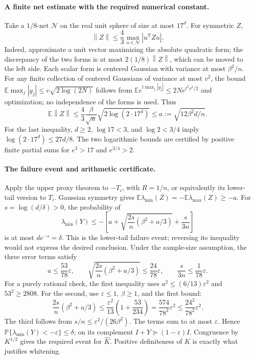 \documentclass[11pt,a4paper]{article}
\newcommand{\norm}[1]{\left\lVert#1\right\rVert}
\begin{document}
\paragraph{A finite net estimate with the required numerical constant.}
Take a $1/8$-net $\mathcal N$ on the real unit sphere of size at most
$17^d$.  For symmetric $Z$,
\[
 \norm{Z}\le\frac43\max_{u\in\mathcal N}|u^{\mathsf T}Zu|.
\]
Indeed, approximate a unit vector maximizing the absolute quadratic
form; the discrepancy of the two forms is at most
$2(1/8)\norm{Z}$, which can be moved to the left side.
Each scalar form is centered Gaussian with variance at most $\beta^2/n$.
For any finite collection of centered Gaussians of variance at most
$v^2$, the bound
$\mathbb E\max_j|g_j|\le v\sqrt{2\log(2N)}$ follows from
$\mathbb Ee^{t\max_j|g_j|}\le2N e^{t^2v^2/2}$ and optimization;
no independence of the forms is used.  Thus
\[
 \mathbb E\norm Z\le\frac43\frac\beta{\sqrt n}
       \sqrt{2\log(2\cdot17^d)}
       \le a:=\sqrt{12\beta^2d/n}.
\]
For the last inequality, $d\ge2$, $\log17<3$, and $\log2<3/4$ imply
$\log(2\cdot17^d)\le27d/8$.  The two logarithmic bounds are certified
by positive finite partial sums for $e^3>17$ and $e^{3/4}>2$.

\paragraph{The failure event and arithmetic certificate.}
Apply the upper proxy theorem to $-T_i$, with $R=1/n$, or equivalently
its lower-tail version to $T_i$.  Gaussian symmetry gives
$\mathbb E\lambda_{\min}(Z)=-\mathbb E\lambda_{\max}(Z)\ge-a$.
For $s=\log(d/\delta)>0$, the probability of
\[
 \lambda_{\min}(Y)
 \le-\left[a+\sqrt{\frac{2s}{n}(\beta^2+a/3)}+\frac{s}{3n}\right]
\]
is at most $de^{-s}=\delta$.  This is the lower-tail failure event;
reversing its inequality would not express the desired conclusion.
Under the sample-size assumption, the three error terms satisfy
\[
 a\le\frac{53}{78}\varepsilon,\qquad
 \sqrt{\frac{2s}{n}(\beta^2+a/3)}\le\frac{24}{78}\varepsilon,
 \qquad \frac{s}{3n}\le\frac1{78}\varepsilon.
\]
For a purely rational check, the first inequality uses
$a^2\le(6/13)\varepsilon^2$ and $53^2\ge2808$.
For the second, use $\varepsilon\le1$, $\beta\ge1$, and the first bound:
\[
 \frac{2s}{n}(\beta^2+a/3)
 \le\frac{\varepsilon^2}{13}
          \left(1+\frac{53}{234}\right)
 =\frac{574}{78^2}\varepsilon^2
 \le\frac{24^2}{78^2}\varepsilon^2.
\]
The third follows from $s/n\le\varepsilon^2/(26\beta^2)$.
The terms sum to at most $\varepsilon$.  Hence
$\mathbb P\{\lambda_{\min}(Y)<-\varepsilon\}\le\delta$;
on its complement $I+Y\succeq(1-\varepsilon)I$.
Congruence by $K^{1/2}$ gives the required event for $\widehat K$.
Positive definiteness of $K$ is exactly what justifies whitening.
\end{document}
